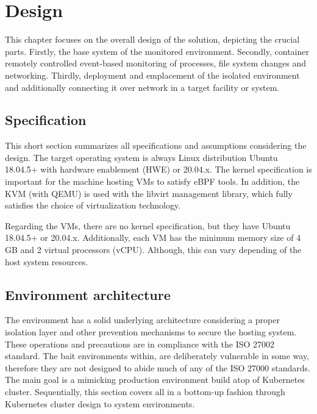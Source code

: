 \chapter{Design \label{design}}
This chapter focuses on the overall design of the solution, depicting the crucial parts. Firstly, the base system of the monitored environment. Secondly, container remotely controlled event-based monitoring of processes, file system changes and networking. Thirdly, deployment and emplacement of the isolated environment and additionally connecting it over network in a target facility or system.

\section{Specification \label{design:specs}}
This short section summarizes all specifications and assumptions considering the design. The target operating system is always Linux distribution Ubuntu 18.04.5+ with hardware enablement (HWE) or 20.04.x. The kernel specification is important for the machine hosting VMs to satisfy eBPF tools. In addition, the KVM (with QEMU) is used with the libvirt management library, which fully satisfies the choice of virtualization technology.

Regarding the VMs, there are no kernel specification, but they have Ubuntu 18.04.5+ or 20.04.x. Additionally, each VM has the minimum memory size of 4 GB and 2 virtual processors (vCPU). Although, this can vary depending of the host system resources.

\section{Environment architecture \label{design:env-arch}}
The environment has a solid underlying architecture considering a proper isolation layer and other prevention mechanisms to secure the hosting system. These operations and precautions are in compliance with the ISO 27002 standard. The bait environments within, are deliberately vulnerable in some way, therefore they are not designed to abide much of any of the ISO 27000 standards. The main goal is a mimicking production environment build atop of Kubernetes cluster. Sequentially, this section covers all in a bottom-up fashion through Kubernetes cluster design to system environments.

